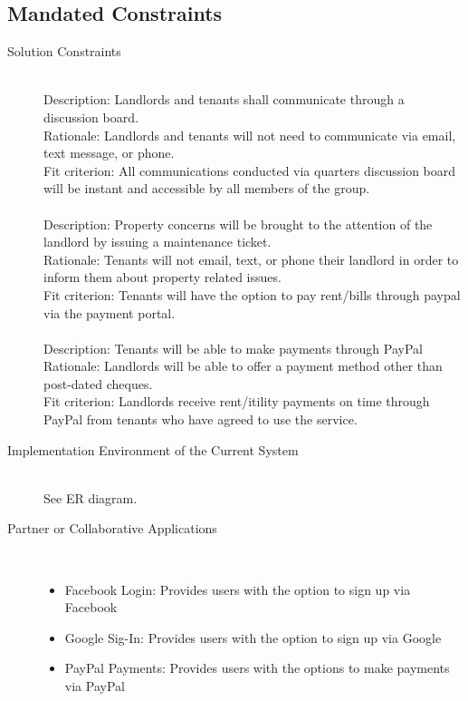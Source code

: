 \documentclass[12pt, titlepage]{article}
\begin{document}
\subsection{Mandated Constraints} %
\begin{description}
  \item[Solution Constraints] \hfill \\
    Description: Landlords and tenants shall communicate through a discussion
    board. \\
    Rationale: Landlords and tenants will not need to communicate via email,
    text message, or phone. \\
    Fit criterion: All communications conducted via quarters discussion
    board will be instant and accessible by all members of the group. \\
    \\
    Description: Property concerns will be brought to the attention of the
    landlord by issuing a maintenance ticket. \\
    Rationale: Tenants will not email, text, or phone their landlord in order
    to inform them about property related issues. \\
    Fit criterion: Tenants will have the option to pay rent/bills through
    paypal via the payment portal. \\
    \\
    Description: Tenants will be able to make payments through PayPal
    Rationale: Landlords will be able to offer a payment method other than
    post-dated cheques. \\
    Fit criterion: Landlords receive rent/itility payments on time through
    PayPal from tenants who have agreed to use the service. \\
  \item[Implementation Environment of the Current System] \hfill \\
    See ER diagram.
  \item[Partner or Collaborative Applications] \hfil \\
    \begin{itemize}
    \item Facebook Login: Provides users with the option to sign up via Facebook
    \item Google Sig-In: Provides users with the option to sign up via Google
    \item PayPal Payments: Provides users with the options to make payments
          via PayPal
    \end{itemize}

\end{description}
\end{document}

